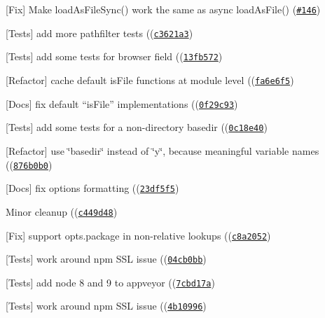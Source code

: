 \begin{DoxyItemize}
\item \mbox{[}Fix\mbox{]} Make load\+As\+File\+Sync() work the same as async load\+As\+File() (\href{https://github.com/browserify/resolve/pull/146}{\tt {\ttfamily \#146}})
\item \mbox{[}Tests\mbox{]} add more pathfilter tests ((\href{https://github.com/browserify/resolve/commit/c3621a35675b275b2b241dd367459ed7afe1c22a}{\tt {\ttfamily c3621a3}})
\item \mbox{[}Tests\mbox{]} add some tests for browser field ((\href{https://github.com/browserify/resolve/commit/13fb572337623622d06450696af6c15b68be26c3}{\tt {\ttfamily 13fb572}})
\item \mbox{[}Refactor\mbox{]} cache default is\+File functions at module level ((\href{https://github.com/browserify/resolve/commit/fa6e6f5a2d34377f6973701733177a280adf0511}{\tt {\ttfamily fa6e6f5}})
\item \mbox{[}Docs\mbox{]} fix default “is\+File” implementations ((\href{https://github.com/browserify/resolve/commit/0f29c93f0c74fc4e52ec6ed6678ce0fec6347e2d}{\tt {\ttfamily 0f29c93}})
\item \mbox{[}Tests\mbox{]} add some tests for a non-\/directory basedir ((\href{https://github.com/browserify/resolve/commit/0c18e40e4929ba2c9426a77079c153c43e50a025}{\tt {\ttfamily 0c18e40}})
\item \mbox{[}Refactor\mbox{]} use \char`\"{}basedir\char`\"{} instead of \char`\"{}y\char`\"{}, because meaningful variable names ((\href{https://github.com/browserify/resolve/commit/876b0b08da9fe44d81681d0c815900485536be9e}{\tt {\ttfamily 876b0b0}})
\item \mbox{[}Docs\mbox{]} fix options formatting ((\href{https://github.com/browserify/resolve/commit/23df5f526823e27e33b01333016b7f58b4f63b6f}{\tt {\ttfamily 23df5f5}})
\item Minor cleanup ((\href{https://github.com/browserify/resolve/commit/c449d4809cf8461a3d54e458780902b95119a969}{\tt {\ttfamily c449d48}})
\item \mbox{[}Fix\mbox{]} support {\ttfamily opts.\+package} in non-\/relative lookups ((\href{https://github.com/browserify/resolve/commit/c8a20524c7d08671c22903e70b952575b0502f7b}{\tt {\ttfamily c8a2052}})
\item \mbox{[}Tests\mbox{]} work around npm S\+SL issue ((\href{https://github.com/browserify/resolve/commit/04cb0bb94628e560bfa4163e73637d3803591714}{\tt {\ttfamily 04cb0bb}})
\item \mbox{[}Tests\mbox{]} add node 8 and 9 to appveyor ((\href{https://github.com/browserify/resolve/commit/7cbd17ae270f9ec24ef05779c3a5e9da3e75c598}{\tt {\ttfamily 7cbd17a}})
\item \mbox{[}Tests\mbox{]} work around npm S\+SL issue ((\href{https://github.com/browserify/resolve/commit/4b1099668477e28117c34f9db3509ff096a49190}{\tt {\ttfamily 4b10996}})
\end{DoxyItemize}


